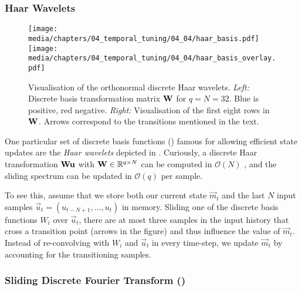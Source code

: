 \subsubsection{Haar Wavelets}

\begin{figure}
	\centering
	\texttt{[image: media/chapters/04\_temporal\_tuning/04\_04/haar\_basis.pdf]}%
	\kern-156.73mm\texttt{[image: media/chapters/04\_temporal\_tuning/04\_04/haar\_basis\_overlay.pdf]}%
	\caption[Visualisation of the orthonormal discrete Haar wavelets]{Visualisation of the orthonormal discrete Haar wavelets.
	\emph{Left:} Discrete basis transformation matrix $\mathbf{W}$ for $q = N = 32$. Blue is positive, red negative.
	\emph{Right:} Visualisation of the first eight rows in $\mathbf{W}$.
	Arrows correspond to the transitions mentioned in the text.
	}
	\label{fig:haar_basis}
\end{figure}

One particular set of discrete basis functions () famous for allowing efficient state updates are the \emph{Haar wavelets} depicted in  \citep{haar1910zur}.
Curiously, a discrete Haar transformation $\mathbf{W} \mathbf{u}$ with $\mathbf{W} \in \mathbb{R}^{q \times N}$ can be computed in $\mathcal{O}(N)$ \citep{kaiser1998fast}, and the sliding spectrum can be updated in $\mathcal{O}(q)$ per sample.

To see this, assume that we store both our current state $\vec m_t$ and the last $N$ input samples $\vec u_t = (u_{t - N + 1}, \ldots, u_{t})$ in memory.
Sliding one of the discrete basis functions $W_i$ over $\vec u_t$, there are at most three samples in the input history that cross a transition point (arrows in the figure) and thus influence the value of $\vec m_t$.
Instead of re-convolving with $W_i$ and $\vec u_t$ in every time-step, we update $\vec m_t$ by accounting for the transitioning samples.

\subsubsection{Sliding Discrete Fourier Transform (\SDFT)}

